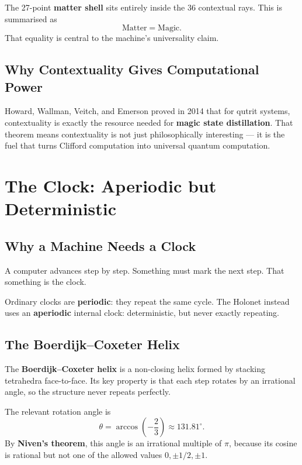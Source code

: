 \documentclass[11pt]{article}
\begin{document}
The 27-point \textbf{matter shell} sits entirely inside the 36 contextual rays. This is summarised as
\begin{equation}
\text{Matter} = \text{Magic}.
\end{equation}
That equality is central to the machine's universality claim.

\subsection{Why Contextuality Gives Computational Power}
Howard, Wallman, Veitch, and Emerson proved in 2014 that for qutrit systems, contextuality is exactly the resource needed for \textbf{magic state distillation}. That theorem means contextuality is not just philosophically interesting --- it is the fuel that turns Clifford computation into universal quantum computation.

\section{The Clock: Aperiodic but Deterministic}

\subsection{Why a Machine Needs a Clock}
A computer advances step by step. Something must mark the next step. That something is the clock.

Ordinary clocks are \textbf{periodic}: they repeat the same cycle. The Holonet instead uses an \textbf{aperiodic} internal clock: deterministic, but never exactly repeating.

\subsection{The Boerdijk--Coxeter Helix}
The \textbf{Boerdijk--Coxeter helix} is a non-closing helix formed by stacking tetrahedra face-to-face. Its key property is that each step rotates by an irrational angle, so the structure never repeats perfectly.

The relevant rotation angle is
\begin{equation}
\theta = \arccos\left(-\frac{2}{3}\right) \approx 131.81^{\circ}.
\end{equation}
By \textbf{Niven's theorem}, this angle is an irrational multiple of \(\pi\), because its cosine is rational but not one of the allowed values \(0, \pm 1/2, \pm 1\).
\end{document}

